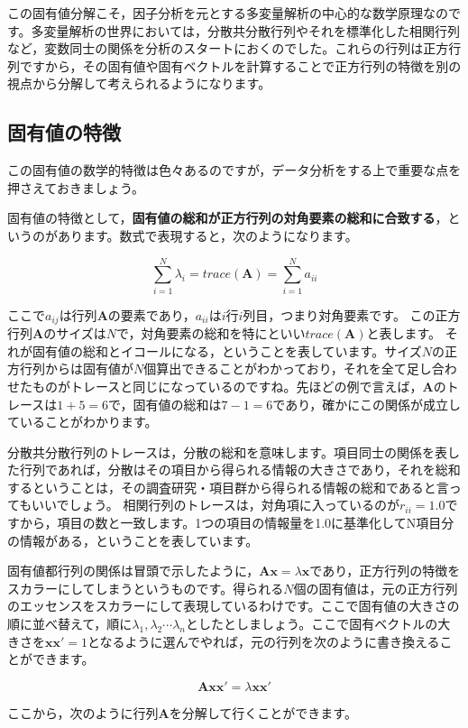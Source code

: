 \documentclass{ltjsbook}
\begin{document}
この固有値分解こそ，因子分析を元とする多変量解析の中心的な数学原理なのです。多変量解析の世界においては，分散共分散行列やそれを標準化した相関行列など，変数同士の関係を分析のスタートにおくのでした。これらの行列は正方行列ですから，その固有値や固有ベクトルを計算することで正方行列の特徴を別の視点から分解して考えられるようになります。

\subsection{固有値の特徴}
この固有値の数学的特徴は色々あるのですが，データ分析をする上で重要な点を押さえておきましょう。

固有値の特徴として，\textbf{固有値の総和が正方行列の対角要素の総和に合致する}，というのがあります。数式で表現すると，次のようになります。

\[ \sum_{i=1}^N \lambda_i = trace(\bm{A}) = \sum_{i=1}^N a_{ii} \]

 ここで$a_{ij}$は行列$\bm{A}$の要素であり，$a_{ii}$は$i$行$i$列目，つまり対角要素です。
この正方行列$\bm{A}$のサイズは$N$で，対角要素の総和を特にといい$trace(\bm{A})$と表します。
それが固有値の総和とイコールになる，ということを表しています。サイズ$N$の正方行列からは固有値が$N$個算出できることがわかっており，それを全て足し合わせたものがトレースと同じになっているのですね。先ほどの例で言えば，$\bm{A}$のトレースは$1+5=6$で，固有値の総和は$7-1=6$であり，確かにこの関係が成立していることがわかります。

分散共分散行列のトレースは，分散の総和を意味します。項目同士の関係を表した行列であれば，分散はその項目から得られる情報の大きさであり，それを総和するということは，その調査研究・項目群から得られる情報の総和であると言ってもいいでしょう。
相関行列のトレースは，対角項に入っているのが$r_{ii}=1.0$ですから，項目の数と一致します。1つの項目の情報量を1.0に基準化してN項目分の情報がある，ということを表しています。

固有値都行列の関係は冒頭で示したように，$\bm{Ax}=\lambda \bm{x}$であり，正方行列の特徴をスカラーにしてしまうというものです。得られる$N$個の固有値は，元の正方行列のエッセンスをスカラーにして表現しているわけです。ここで固有値の大きさの順に並べ替えて，順に$\lambda_1,\lambda_2 \cdots \lambda_n$としたとしましょう。ここで固有ベクトルの大きさを$\bm{xx'}=1$となるように選んでやれば，元の行列を次のように書き換えることができます。

\[
    \bm{Axx'} = \lambda \bm{xx'}
\]

ここから，次のように行列$\bm{A}$を分解して行くことができます。
\end{document}
